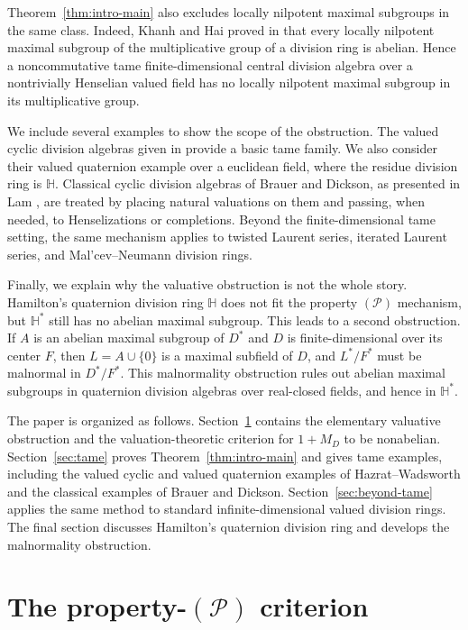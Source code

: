\documentclass[11pt]{amsart}
\theoremstyle{definition}
\begin{document}
Theorem~\ref{thm:intro-main} also excludes locally nilpotent maximal
subgroups in the same class.  Indeed, Khanh and Hai proved in \cite{KH2} that every locally nilpotent maximal subgroup of the multiplicative group of a division ring is
abelian.  Hence a noncommutative tame finite-dimensional central
division algebra over a nontrivially Henselian valued field has no locally
nilpotent maximal subgroup in its multiplicative group.

We include several examples to show the scope of the obstruction.  The valued
cyclic division algebras given in \cite{HaW1} provide a basic tame family.  We
also consider their valued quaternion example over a euclidean field, where
the residue division ring is $\mathbb H$.  Classical cyclic division algebras
of Brauer and Dickson, as presented in Lam \cite{L}, are treated by placing natural
valuations on them and passing, when needed, to Henselizations or completions.
Beyond the finite-dimensional tame setting, the same mechanism applies to
twisted Laurent series, iterated Laurent series, and Mal'cev--Neumann division
rings.

Finally, we explain why the valuative obstruction is not the whole story.
Hamilton's quaternion division ring $\mathbb H$ does not fit the property
$(\mathcal P)$ mechanism, but $\mathbb H^*$ still has no abelian maximal
subgroup.  This leads to a second obstruction.  If $A$ is an abelian maximal
subgroup of $D^*$ and $D$ is finite-dimensional over its center $F$, then
$L=A\cup\{0\}$ is a maximal subfield of $D$, and $L^*/F^*$ must be malnormal
in $D^*/F^*$.  This malnormality obstruction rules out abelian maximal
subgroups in quaternion division algebras over real-closed fields, and hence
in $\mathbb H^*$.

The paper is organized as follows.  Section~\ref{sec:normal-obstruction}
contains the elementary valuative obstruction and the valuation-theoretic
criterion for $1+M_D$ to be nonabelian.  Section~\ref{sec:tame} proves
Theorem~\ref{thm:intro-main} and gives tame examples, including the valued
cyclic and valued quaternion examples of Hazrat--Wadsworth and the classical
examples of Brauer and Dickson.  Section~\ref{sec:beyond-tame} applies the
same method to standard infinite-dimensional valued division rings.  The final
section discusses Hamilton's quaternion division ring and develops the
malnormality obstruction.

\section{The property-$(\mathcal P)$ criterion}
\label{sec:normal-obstruction}
\end{document}
